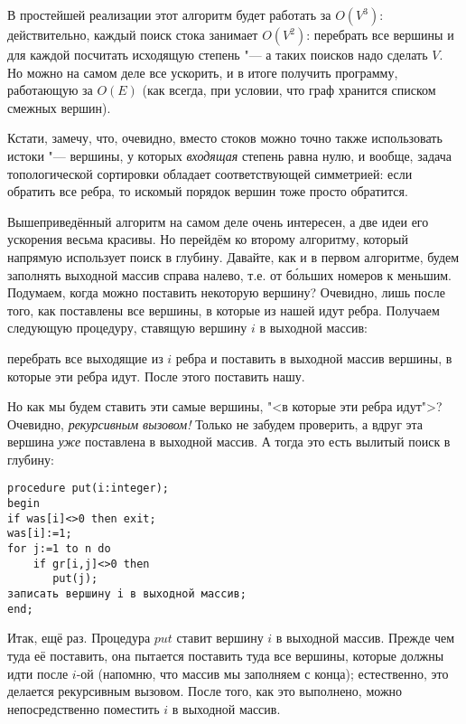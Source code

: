 В простейшей реализации этот алгоритм будет работать за $O(V^3)$: действительно, каждый поиск стока 
занимает $O(V^2)$: перебрать все вершины и для каждой посчитать исходящую степень "--- а таких 
поисков надо сделать $V$. Но можно на самом деле все ускорить, и в итоге получить программу, 
работающую за $O(E)$ (как всегда, при условии, что граф хранится списком смежных вершин).


Кстати, замечу, что, очевидно, вместо стоков можно точно также использовать истоки "--- вершины, у 
которых \textit{входящая} степень равна нулю, и вообще, задача топологической сортировки обладает 
соответствующей симметрией: если обратить все ребра, то искомый порядок вершин тоже просто 
обратится.

Вышеприведённый алгоритм на самом деле очень интересен, а две идеи его ускорения весьма красивы. Но 
перейдём ко второму алгоритму, который напрямую использует поиск в глубину. Давайте, как и в первом 
алгоритме, будем заполнять выходной массив справа налево, т.е. от б\'{о}льших номеров к меньшим. 
Подумаем, когда можно поставить некоторую вершину? Очевидно, лишь после того, как поставлены все 
вершины, в которые из нашей идут ребра. Получаем следующую процедуру, ставящую вершину $i$ в 
выходной массив: 
\begin{center}
перебрать все выходящие из $i$ ребра и поставить в выходной массив вершины, в 
которые эти ребра идут. После этого поставить нашу. 
\end{center}
Но как мы будем ставить эти самые вершины, "<в которые эти ребра идут">? Очевидно, 
\textit{рекурсивным вызовом!} Только не забудем проверить, а вдруг эта вершина \textit{уже} поставлена в 
выходной массив. А тогда это есть вылитый поиск в глубину:
\begin{codesampleo}\begin{verbatim}
procedure put(i:integer);
begin
if was[i]<>0 then exit;
was[i]:=1;
for j:=1 to n do
    if gr[i,j]<>0 then
       put(j);
записать вершину i в выходной массив;
end;
\end{verbatim}
\end{codesampleo}
Итак, ещё раз. Процедура $put$ ставит вершину $i$ в выходной массив. Прежде чем туда её поставить, 
она пытается поставить туда все вершины, которые должны идти после $i$-ой (напомню, что массив мы 
заполняем с конца); естественно, это делается рекурсивным вызовом. После того, как это выполнено, 
можно непосредственно поместить $i$ в выходной массив.


